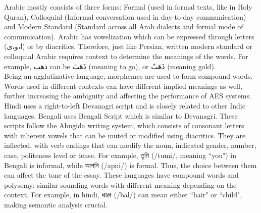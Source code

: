 \documentclass{article}
\begin{document}
	Arabic mostly consists of three forms: Formal (used in formal texts, like in Holy Quran), Colloquial (Informal conversation used in day-to-day communication) and Modern Standard (Standard across all Arab dialects and formal mode of communication). Arabic has vowelization which can be expressed through letters (\textarabic{ا،و،ى}) or by diacritics. Therefore, just like Persian, written modern standard or colloquial Arabic requires context to determine the meanings of the words. For example, \textarabic{ذهب} can be \textarabic{ذَهَبَ} (meaning to go), or \textarabic{ذَهَبٌ} (meaning gold). \\
	Being an agglutinative language, morphemes are used to form compound words. Words used in different contexts can have different implied meanings as well, further increasing the ambiguity and affecting the performance of AES systems. \\
	Hindi uses a right-to-left Devanagri script and is closely related to other Indic languages. Bengali uses Bengali Script which is similar to Devanagri. These scripts follow the Abugida writing system, which consists of consonant letters with inherent vowels that can be muted or modified using diacritics. They are inflected, with verb endings that can modify the noun, indicated gender, number, case, politeness level or tense. For example, \textbengali{তুমি} (/tumi/, meaning ``you") in Bengali is informal, while \textbengali{আপনি} (/apni/) is formal. Thus, the choice between them can affect the tone of the essay. These languages have compound words and polysemy: similar sounding words with different meaning depending on the context. For example, in hindi, \texthindi{बाल} (/bāl/) can mean either ``hair" or ``child", making semantic analysis crucial.
\end{document}
